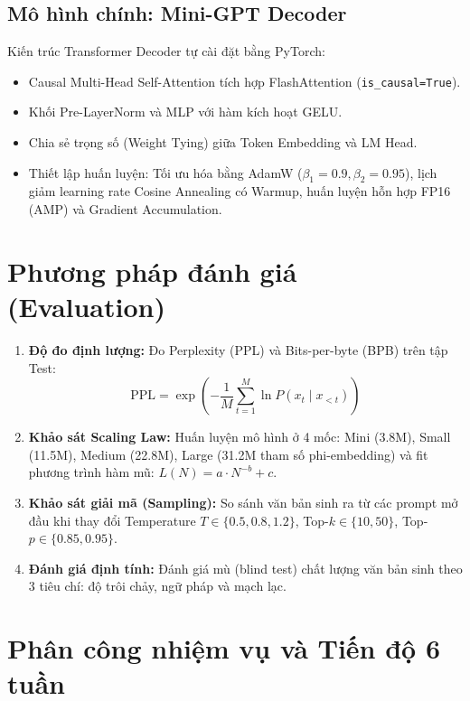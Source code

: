 \documentclass[11pt,a4paper]{article}
\begin{document}
\subsection{Mô hình chính: Mini-GPT Decoder}
Kiến trúc Transformer Decoder tự cài đặt bằng PyTorch:
\begin{itemize}
    \item Causal Multi-Head Self-Attention tích hợp FlashAttention (\texttt{is\_causal=True}).
    \item Khối Pre-LayerNorm và MLP với hàm kích hoạt GELU.
    \item Chia sẻ trọng số (Weight Tying) giữa Token Embedding và LM Head.
    \item Thiết lập huấn luyện: Tối ưu hóa bằng AdamW ($\beta_1=0.9, \beta_2=0.95$), lịch giảm learning rate Cosine Annealing có Warmup, huấn luyện hỗn hợp FP16 (AMP) và Gradient Accumulation.
\end{itemize}

\section{Phương pháp đánh giá (Evaluation)}
\begin{enumerate}
    \item \textbf{Độ đo định lượng:} Đo Perplexity (PPL) và Bits-per-byte (BPB) trên tập Test:
    \begin{equation}
    \text{PPL} = \exp\left(-\frac{1}{M} \sum_{t=1}^M \ln P(x_t \mid x_{<t})\right)
    \end{equation}
    \item \textbf{Khảo sát Scaling Law:} Huấn luyện mô hình ở 4 mốc: Mini (3.8M), Small (11.5M), Medium (22.8M), Large (31.2M tham số phi-embedding) và fit phương trình hàm mũ: $L(N) = a \cdot N^{-b} + c$.
    \item \textbf{Khảo sát giải mã (Sampling):} So sánh văn bản sinh ra từ các prompt mở đầu khi thay đổi Temperature $T \in \{0.5, 0.8, 1.2\}$, Top-$k \in \{10, 50\}$, Top-$p \in \{0.85, 0.95\}$.
    \item \textbf{Đánh giá định tính:} Đánh giá mù (blind test) chất lượng văn bản sinh theo 3 tiêu chí: độ trôi chảy, ngữ pháp và mạch lạc.
\end{enumerate}

\section{Phân công nhiệm vụ và Tiến độ 6 tuần}
\end{document}
